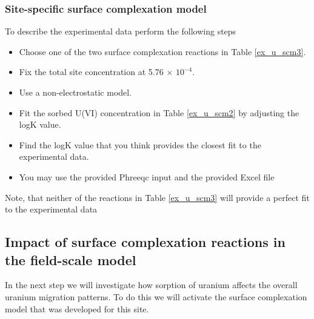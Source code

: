 \subsubsection{Site-specific surface complexation model}

To describe the experimental data perform the following steps
\begin{itemize}
\item Choose one of the two surface complexation reactions 
in Table \ref{ex_u_scm3}. 
\item Fix the total site concentration at 5.76 $\times$ $10^{-4}$.  
\item Use a non-electrostatic model. 
\item Fit the sorbed U(VI) concentration in Table \ref{ex_u_scm2} 
by adjusting the logK value.   
\item Find the logK value that you think provides the closest 
fit to the experimental data. 
\item You may use the provided Phreeqc input and the provided Excel file
\end{itemize}

Note, that neither of the reactions in Table \ref{ex_u_scm3} 
will provide a perfect fit to the experimental data

\subsection{Impact of surface complexation reactions 
in the field-scale model}

In the next step we will investigate how sorption of uranium affects
the overall uranium migration patterns. To do this we will activate the
surface complexation model that was developed for this site. 

